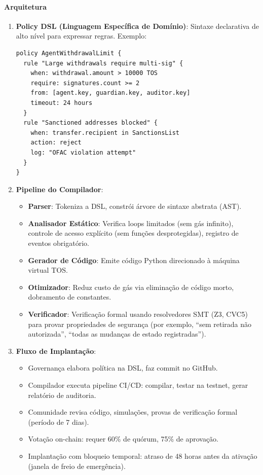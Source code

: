 \documentclass[11pt]{article}
\begin{document}
\paragraph{Arquitetura}
\begin{enumerate}[noitemsep]
  \item \textbf{Policy DSL (Linguagem Específica de Domínio)}: Sintaxe declarativa de alto nível para expressar regras. Exemplo:
  \begin{verbatim}
policy AgentWithdrawalLimit {
  rule "Large withdrawals require multi-sig" {
    when: withdrawal.amount > 10000 TOS
    require: signatures.count >= 2
    from: [agent.key, guardian.key, auditor.key]
    timeout: 24 hours
  }
  rule "Sanctioned addresses blocked" {
    when: transfer.recipient in SanctionsList
    action: reject
    log: "OFAC violation attempt"
  }
}
  \end{verbatim}
  \item \textbf{Pipeline do Compilador}:
    \begin{itemize}[noitemsep]
      \item \textbf{Parser}: Tokeniza a DSL, constrói árvore de sintaxe abstrata (AST).
      \item \textbf{Analisador Estático}: Verifica loops limitados (sem gás infinito), controle de acesso explícito (sem funções desprotegidas), registro de eventos obrigatório.
      \item \textbf{Gerador de Código}: Emite código Python direcionado à máquina virtual TOS.
      \item \textbf{Otimizador}: Reduz custo de gás via eliminação de código morto, dobramento de constantes.
      \item \textbf{Verificador}: Verificação formal usando resolvedores SMT (Z3, CVC5) para provar propriedades de segurança (por exemplo, ``sem retirada não autorizada'', ``todas as mudanças de estado registradas'').
    \end{itemize}
  \item \textbf{Fluxo de Implantação}:
    \begin{itemize}[noitemsep]
      \item Governança elabora política na DSL, faz commit no GitHub.
      \item Compilador executa pipeline CI/CD: compilar, testar na testnet, gerar relatório de auditoria.
      \item Comunidade revisa código, simulações, provas de verificação formal (período de 7 dias).
      \item Votação on-chain: requer 60\% de quórum, 75\% de aprovação.
      \item Implantação com bloqueio temporal: atraso de 48 horas antes da ativação (janela de freio de emergência).
    \end{itemize}
\end{enumerate}
\end{document}
